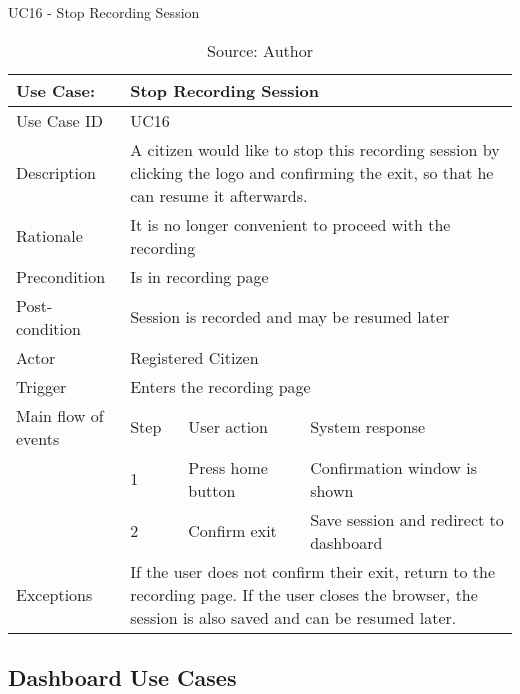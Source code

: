 \begin{table}[h]
\centering
\caption{UC16 - Stop Recording Session}
\label{uc:16}
\begin{tabular}{|p{3cm}|p{1cm}|p{5cm}|p{5cm}|}
\hline
Use Case:       & \multicolumn{3}{p{11cm}|}{Stop Recording Session} \\ \hline
Use Case ID     & \multicolumn{3}{p{11cm}|}{UC16} \\ \hline
Description     & \multicolumn{3}{p{11cm}|}{A citizen would like to stop this recording session by clicking the logo and confirming the exit, so that he can resume it afterwards.} \\ \hline
Rationale       & \multicolumn{3}{p{11cm}|}{It is no longer convenient to proceed with the recording} \\ \hline
Precondition    & \multicolumn{3}{p{11cm}|}{Is in recording page} \\ \hline
Post-condition  & \multicolumn{3}{p{11cm}|}{Session is recorded and may be resumed later} \\ \hline
Actor           & \multicolumn{3}{p{11cm}|}{Registered Citizen} \\ \hline
Trigger         & \multicolumn{3}{p{11cm}|}{Enters the recording page} \\ \hline
Main flow of events & Step  & User action & System response \\ \hline
                    & 1     & Press home button & Confirmation window is shown \\ \hline
                    & 2     & Confirm exit & Save session and redirect to dashboard \\ \hline
Exceptions      & \multicolumn{3}{p{11cm}|}{If the user does not confirm their exit, return to the recording page. If the user closes the browser, the session is also saved and can be resumed later.} \\ \hline
\end{tabular}
\caption*{Source: Author}
\end{table}


\clearpage
\subsection{Dashboard Use Cases}

